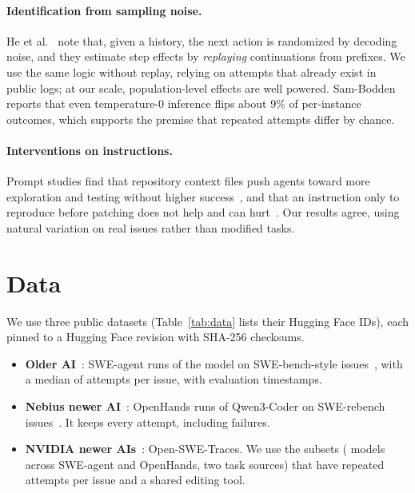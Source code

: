 \documentclass[sigconf,review=false,anonymous=false]{acmart}
\begin{document}
\paragraph{Identification from sampling noise.} He et al.~\cite{he2026process} note that, given a history, the next action is randomized by decoding noise, and they estimate step effects by \emph{replaying} continuations from prefixes. We use the same logic without replay, relying on attempts that already exist in public logs; at our scale, population-level effects are well powered. Sam-Bodden~\cite{sambodden2026context} reports that even temperature-0 inference flips about 9\% of per-instance outcomes, which supports the premise that repeated attempts differ by chance.

\paragraph{Interventions on instructions.} Prompt studies find that repository context files push agents toward more exploration and testing without higher success~\cite{gloaguen2026agentsmd}, and that an instruction only to reproduce before patching does not help and can hurt~\cite{gloaguen2026act}. Our results agree, using natural variation on real issues rather than modified tasks.

\section{Data}

We use three public datasets (Table~\ref{tab:data} lists their Hugging Face IDs), each pinned to a Hugging Face revision with SHA-256 checksums.

\begin{itemize}
  \item \textbf{Older AI}~\cite{nebius2024trajectories}: SWE-agent runs of the  model on SWE-bench-style issues~\cite{jimenez2024swebench}, with a median of \OlderTriesPerIssue{} attempts per issue, with evaluation timestamps.
  \item \textbf{Nebius newer AI}~\cite{nebius2025openhands}: OpenHands runs of Qwen3-Coder on SWE-rebench issues~\cite{badertdinov2025swerebench}. It keeps every attempt, including failures.
  \item \textbf{NVIDIA newer AIs}~\cite{ahmad2026openswetraces}: Open-SWE-Traces. We use the \NumNewerConfigs{} subsets (\NumNewerModels{} models across SWE-agent and OpenHands, two task sources) that have repeated attempts per issue and a shared editing tool.
\end{itemize}
\end{document}
